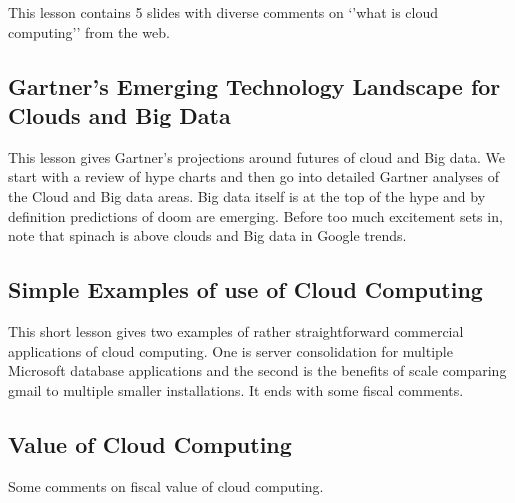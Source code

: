This lesson contains 5 slides with diverse comments on `'what is cloud
computing'' from the web.






\subsection{Gartner's Emerging Technology Landscape for Clouds and
  Big Data}\label{gartners-emerging-technology-landscape-for-clouds-and-big-data}

This lesson gives Gartner's projections around futures of cloud and Big
data. We start with a review of hype charts and then go into detailed
Gartner analyses of the Cloud and Big data areas. Big data itself is at
the top of the hype and by definition predictions of doom are emerging.
Before too much excitement sets in, note that spinach is above clouds
and Big data in Google trends.



\subsection{Simple Examples of use of Cloud Computing}

This short lesson gives two examples of rather straightforward
commercial applications of cloud computing. One is server consolidation
for multiple Microsoft database applications and the second is the
benefits of scale comparing gmail to multiple smaller installations. It
ends with some fiscal comments.



\subsection{Value of Cloud Computing}\label{value-of-cloud-computing}

Some comments on fiscal value of cloud computing.


